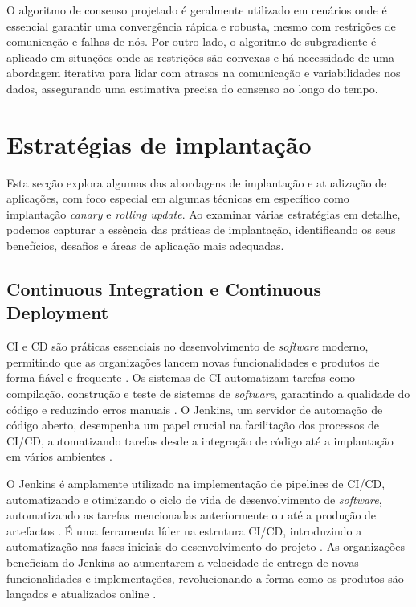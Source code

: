 O algoritmo de consenso projetado é geralmente utilizado em cenários onde é essencial garantir uma
convergência rápida e robusta, mesmo com restrições de comunicação e falhas de nós. Por outro lado,
o algoritmo de subgradiente é aplicado em situações onde as restrições são convexas e há necessidade
de uma abordagem iterativa para lidar com atrasos na comunicação e variabilidades nos dados, 
assegurando uma estimativa precisa do consenso ao longo do tempo.

\section{Estratégias de implantação}

Esta secção explora algumas das abordagens de implantação e atualização de aplicações, com foco 
especial em algumas técnicas em específico como implantação \textit{canary} e \textit{rolling update}.
Ao examinar várias estratégias em detalhe, podemos capturar a essência das práticas de implantação, 
identificando os seus benefícios, desafios e áreas de aplicação mais adequadas. 

\subsection{Continuous Integration e Continuous Deployment}
\label{sec:ci-cd}

\ac{CI} e \ac{CD} são práticas essenciais no desenvolvimento de \textit{software} moderno, 
permitindo que as organizações lancem novas funcionalidades e produtos de forma fiável e 
frequente \cite{ci2017}. Os sistemas de \ac{CI} automatizam tarefas como compilação, construção e 
teste de sistemas de \textit{software}, garantindo a qualidade do código e reduzindo erros
manuais \cite{ci2016}. O Jenkins, um servidor de automação de código aberto, desempenha um
papel crucial na facilitação dos processos de \ac{CI}/\ac{CD}, automatizando tarefas desde a 
integração de código até a implantação em vários ambientes \cite{ci2022}.

O Jenkins é amplamente utilizado na implementação de pipelines de \ac{CI}/\ac{CD}, automatizando e 
otimizando o ciclo de vida de desenvolvimento de \textit{software}, automatizando as tarefas
mencionadas anteriormente ou até a produção de artefactos \cite{ci2024}. É uma ferramenta líder na 
estrutura \ac{CI}/\ac{CD}, introduzindo a automatização nas fases iniciais do desenvolvimento do 
projeto \cite{ci2024b}. As organizações beneficiam do Jenkins ao aumentarem a velocidade de entrega 
de novas funcionalidades e implementações, revolucionando a forma como os produtos são lançados e 
atualizados online \cite{ci2022b}.

